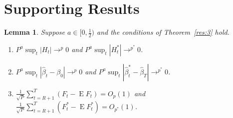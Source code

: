 \documentclass[12pt,fleqn]{article}
\newtheorem{lema}{Lemma}[section]
\theoremstyle{definition}
\DeclareMathOperator{\E}{E}
\begin{document}
\section{Supporting Results}

\begin{lema}\label{res:a2}
  Suppose $a \in [0,\frac12)$ and the conditions of Theorem~\ref{res:3}
  hold.
  \begin{enumerate}
  \item $P^a \sup_t | H_{t} | \to^p 0$ and $P^a \sup_t | H_{t}^{*} |
    \to^{p^{*}} 0$.
  \item $P^a \sup_t | \hat{\beta}_{t} - \beta_{0} | \to^{p} 0$ and
    $P^a \sup_t | \hat{\beta}^{*}_{t} - \hat{\beta}_T |
    \to^{p^{*}} 0$.
  \item $\tfrac{1}{\sqrt{P}} \sum_{t=R+1}^T (F_t - \E F_t) = O_{p}(1)$
    and $\tfrac{1}{\sqrt{P}} \sum_{t=R+1}^T (F_t^* - \E F_t^*) =
    O_{p^*}(1)$.
  \end{enumerate}
\end{lema}
\end{document}
